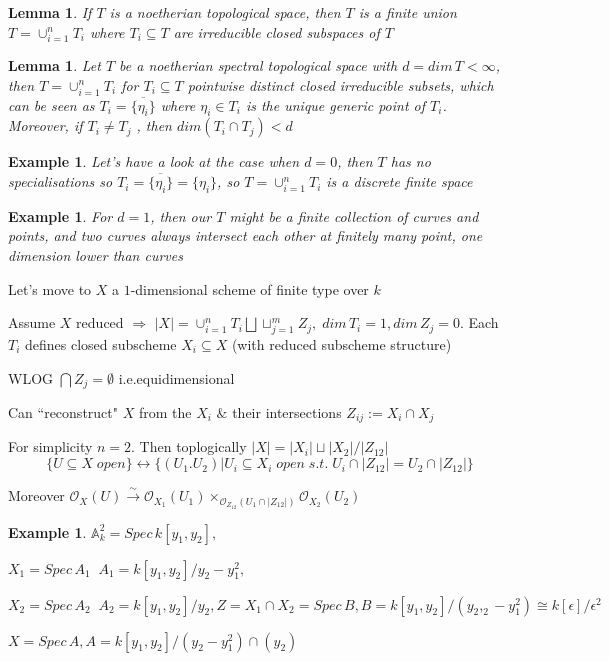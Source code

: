 \documentclass{article}
\newtheorem{lemma}[theorem]{Lemma}
\newtheorem{example}[theorem]{Example}
\begin{document}
\begin{lemma}
If $T$ is a noetherian topological space, then $T$ is a finite union $T =\cup^n_{i=1} T_i$ where $T_i \subseteq T$
are irreducible closed subspaces of $T$
\end{lemma}

\begin{lemma}
Let $T$ be a noetherian spectral topological space with $d = dim\, T < \infty$, then $T =\cup^n_{i=1} T_i$
for $T_i \subseteq T$ pointwise distinct closed irreducible subsets, which can be seen as $T_i =\overline {\{ \eta_i\}}$ where $\eta_i \in T_i$ is
the unique generic point of $T_i$. Moreover, if $T_i \ne T_j$ , then $dim(T_i \cap T_j ) < d$
\end{lemma}

\begin{example}
Let’s have a look at the case when $d = 0$, then $T$ has no specialisations so $T_i = \overline {\{ \eta_i\}} =
\{\eta_i\}$, so $T =\cup^n_{i=1} T_i$
is a discrete finite space
\end{example}

\begin{example}
For $d = 1$, then our $T$ might be a finite collection of curves and points, and two curves
always intersect each other at finitely many point, one dimension lower than curves
\end{example}

Let's move to $X$ a $1$-dimensional scheme of finite type over $k$

Assume $X$ reduced $\Rightarrow$ $|X|=\cup_{i=1}^n T_i \bigsqcup \sqcup_{j=1}^mZ_j, \;dim\,T_i=1, dim\,Z_j=0$. Each $T_i$ defines closed subscheme $X_i\subseteq X$ (with reduced subscheme structure)

WLOG $\bigcap Z_j = \emptyset$ i.e.equidimensional

Can ``reconstruct" $X$ from the $X_i$ $\&$ their intersections $Z_{ij}:=X_i\cap X_j$

For simplicity $n=2$. Then toplogically $|X|=|X_i|\sqcup|X_2|/|Z_{12}|$
$$
\{U\subseteq X\;open\}
\leftrightarrow
\{
(U_1.U_2)|U_i\subseteq X_i\;open\;s.t.\;U_i\cap|Z_{12}|=U_2\cap|Z_{12}|
\}
$$

Moreover $\mathcal O_X(U)\xrightarrow{\sim} \mathcal O_{X_1}(U_1) \times_{\mathcal O_{Z_{12}}(U_1\cap|Z_{12}|)} \mathcal O_{X_2}(U_2)$

\begin{example}
$\mathbb A_k^2=Spec\,k[y_1,y_2], $
    
$X_1=Spec\,A_1\;\;A_1=k[y_1,y_2]/y_2-y_1^2, $

$X_2=Spec\,A_2\;\;A_2=k[y_1,y_2]/y_2,Z=X_1\cap X_2=Spec\,B,B=k[y_1,y_2]/(y_2,_2-y_1^2)\cong k[\epsilon]/\epsilon^2$

$X=Spec\,A,A=k[y_1,y_2]/(y_2-y_1^2)\cap(y_2)$
\end{example}
\end{document}
